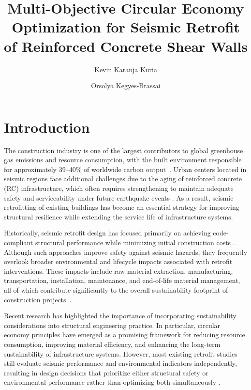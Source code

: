 \documentclass[fleqn,10pt]{wlscirep}
\title{Multi-Objective Circular Economy Optimization for Seismic Retrofit of Reinforced Concrete Shear Walls}
\author[1,*]{Kevin Karanja Kuria}
\author[2]{Orsolya Kegyes-Brassai}
\affil[1]{Department of Structural Engineering and Geotechnics, Széchenyi István University, 9026 Győr, Hungary;  }
\affil[*]{\href{mailto:kevin.karanja.kuria@sze.hu}{kevin.karanja.kuria@sze.hu} }
\begin{document}
\flushbottom
\maketitle
%
%
\thispagestyle{empty}


\section{Introduction}
\label{sec:intro}

The construction industry is one of the largest contributors to global greenhouse
gas emissions and resource consumption, with the built environment responsible for
approximately 39--40\% of worldwide carbon output~\cite{UrgeVorsatz2020}. Urban
centers located in seismic regions face additional challenges due to the aging of
reinforced concrete (RC) infrastructure, which often requires strengthening to
maintain adequate safety and serviceability under future earthquake events
\cite{gkournelos2021}. As a result, seismic retrofitting of existing buildings has
become an essential strategy for improving structural resilience while extending
the service life of infrastructure systems.

Historically, seismic retrofit design has focused primarily on achieving
code-compliant structural performance while minimizing initial construction costs
\cite{caruso2021}. Although such approaches improve safety against seismic hazards,
they frequently overlook broader environmental and lifecycle impacts associated
with retrofit interventions. These impacts include raw material extraction,
manufacturing, transportation, installation, maintenance, and end-of-life material
management, all of which contribute significantly to the overall sustainability
footprint of construction projects~\cite{hossain2016}.

Recent research has highlighted the importance of incorporating sustainability
considerations into structural engineering practice. In particular, circular
economy principles have emerged as a promising framework for reducing resource
consumption, improving material efficiency, and enhancing the long-term
sustainability of infrastructure systems. However, most existing retrofit studies
still evaluate seismic performance and environmental indicators independently,
resulting in design decisions that prioritize either structural safety or
environmental performance rather than optimizing both simultaneously
\cite{Salgado2020,Vitiello2016,Villalba2024,Passoni2024,Clemett2022,Dong2023}.
\end{document}
